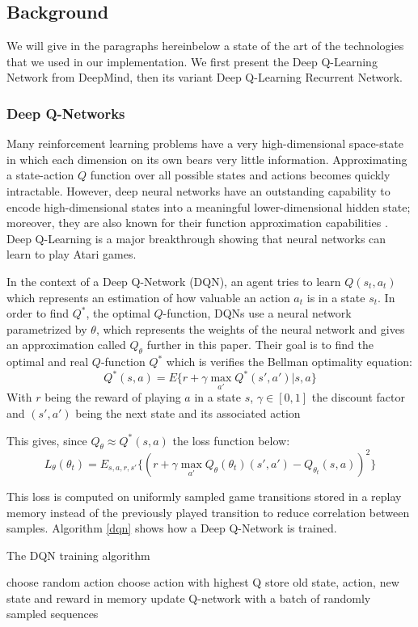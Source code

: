 \documentclass[letterpaper]{article}
\begin{document}
\subsection{Background} We will give in the paragraphs hereinbelow a state of
the art of the technologies that we used in our implementation. We first present
the Deep Q-Learning Network from DeepMind, then its variant Deep Q-Learning
Recurrent Network.

\subsubsection{Deep Q-Networks}
Many reinforcement learning problems have a very high-dimensional space-state
in which each dimension on its own bears very little information. Approximating
a state-action $Q$ function over all possible states and actions becomes quickly
intractable. However, deep neural networks have an outstanding capability to
encode high-dimensional states into a meaningful lower-dimensional hidden state;
moreover, they are also known for their function approximation capabilities
\citep{Hornik1991}. Deep Q-Learning \citep{Mnih2015} is a major breakthrough
showing that neural networks can learn to play Atari games.

In the context of a Deep Q-Network (DQN), an agent tries to learn
$Q(s_t,a_t)$ which represents an
estimation of how valuable an action $a_t$ is in a state $s_t$. In order to
find $Q^*$, the optimal $Q$-function, DQNs use a neural network
parametrized by $\theta$, which represents the weights of the neural network
and gives an approximation called $Q_\theta$ further in this paper. Their goal
is to find the optimal and real $Q$-function $Q^*$ which is verifies the Bellman
optimality equation:
$$ Q^*(s,a) = E\{r + \gamma \max_{a'}Q^*(s',a')|s,a\} $$
With $r$ being the reward of playing $a$ in a state $s$, $\gamma\in [0,1]$ the
discount factor and $(s',a')$ being the next state and its associated action

This gives, since $Q_{\theta} \approx Q^*(s,a)$ the loss function below:
$$ L_\theta(\theta_t) = E_{s,a,r,s'}\{(r +\gamma \max_{a'}Q_\theta(\theta_t)(s' , a' )-Q_{\theta_t}(s,a))^2\}$$

This loss is computed on uniformly sampled game transitions stored in a
replay memory instead of the previously played transition to reduce correlation
between samples. Algorithm \ref{dqn} shows how a Deep Q-Network is trained.
\begin{algorithm}
\caption{The DQN training algorithm}\label{dqn}
\begin{algorithmic}
				\State choose random action
			\Else
				\State choose action with highest Q
			\EndIf
			\State store old state, action, new state and reward in memory
		\EndWhile
			\State update Q-network with a batch of randomly
			sampled sequences
		\EndFor
	\EndFor
\end{algorithmic}
\end{algorithm}
\end{document}
